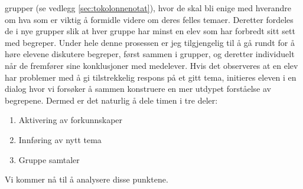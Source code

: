 \documentclass[main.tex]{subfiles}
\begin{document}
grupper (se vedlegg \ref{sec:tokolonnenotat}), hvor de skal bli enige med hverandre om hva som er 
viktig å formidle videre om deres felles temaer. Deretter fordeles de i nye grupper slik at hver 
gruppe har minst en elev som har forbredt sitt sett med begreper. Under hele denne prosessen er jeg 
tilgjengelig til å gå rundt for å høre elevene diskutere begreper, først sammen i grupper, og 
deretter individuelt når de fremfører sine konklusjoner med medelever. Hvis det observeres at en 
elev har problemer med å gi tilstrekkelig respons på et gitt tema, initieres eleven i en dialog 
hvor vi forsøker å sammen konstruere en mer utdypet forståelse av begrepene.
\newline
\newline
Dermed er det naturlig å dele timen i tre deler:
\begin{enumerate}
\item Aktivering av forkunnskaper  
\item Innføring av nytt tema
\item Gruppe samtaler
\end{enumerate}
Vi kommer nå til å analysere disse punktene.
\end{document}
